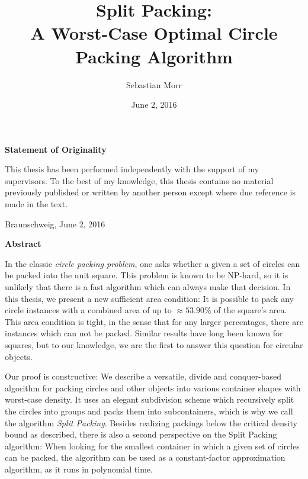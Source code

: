 \documentclass[a4paper,style=print,oneside,bibliography=totoc,nexus,lnum,extramargin]{tubsbook}
\title{Split Packing:\\ A Worst-Case Optimal Circle Packing Algorithm}
\author{\sffamily\LARGE Sebastian Morr}
\date{\large June 2, 2016}
\begin{document}
\frontmatter %

\maketitle
\cleardoublepage

\thispagestyle{plain} %
\vspace*{7cm}
\centerline{\bfseries Statement of Originality}
\vspace*{1em}
\noindent
This thesis has been performed independently with the support of my supervisors.
To the best of my knowledge, this thesis contains no material previously
published or written by another person except where due reference is made in the text.

\par
  \bigskip\noindent Braunschweig, June 2, 2016 \par
  \vspace*{10mm}
  \hfill\hrulefill
\cleardoublepage

\thispagestyle{plain} %
\centerline{\bfseries Abstract}
\vspace*{1em}
\noindent

In the classic \emph{circle packing problem}, one asks whether a given a set of circles can be packed into the unit square. This problem is known to be NP-hard, so it is unlikely that there is a fast algorithm which can always make that decision.
In this thesis, we present a new sufficient area condition: It is possible to pack any circle instances with a combined area of up to $\approx \! 53.90\%$ of the square's area. This area condition is tight, in the sense that for any larger percentages, there are instances which can not be packed. Similar results have long been known for squares, but to our knowledge, we are the first to answer this question for circular objects.


Our proof is constructive: We describe a versatile, divide and conquer-based algorithm for packing circles and other objects into various container shapes with worst-case density. It uses an elegant subdivision scheme which recursively split the circles into groups and packs them into subcontainers, which is why we call the algorithm \emph{Split Packing}.
Besides realizing packings below the critical density bound as described, there is also a second perspective on the Split Packing algorithm: When looking for the smallest container in which a given set of circles can be packed, the algorithm can be used as a constant-factor approximation algorithm, as it runs in polynomial time.
\end{document}
